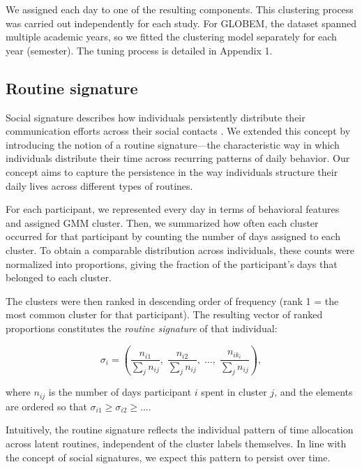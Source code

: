 \documentclass[pdflatex,sn-vancouver,Numbered]{bst/sn-jnl}%
\theoremstyle{thmstyleone}%
\theoremstyle{thmstyletwo}%
\theoremstyle{thmstylethree}%
\begin{document}
We assigned each day to one of the resulting components. This clustering process was carried out independently for each study. For GLOBEM, the dataset spanned multiple academic years, so we fitted the clustering model separately for each year (semester). The tuning process is detailed in Appendix 1.

\subsection*{Routine signature}\label{sec:methods:signature}  

Social signature describes how individuals persistently distribute their communication efforts across their social contacts \cite{saramaki2014persistence}. We extended this concept by introducing the notion of a routine signature—the characteristic way in which individuals distribute their time across recurring patterns of daily behavior. Our concept aims to capture the persistence in the way individuals structure their daily lives across different types of routines.

For each participant, we represented every day in terms of behavioral features and assigned GMM cluster. Then, we summarized how often each cluster occurred for that participant by counting the number of days assigned to each cluster. To obtain a comparable distribution across individuals, these counts were normalized into proportions, giving the fraction of the participant’s days that belonged to each cluster.  

The clusters were then ranked in descending order of frequency (rank 1 = the most common cluster for that participant). 
The resulting vector of ranked proportions constitutes the \textit{routine signature} of that individual:

\begin{equation}
    \sigma_i = \left(
    \frac{n_{i1}}{\sum_j n_{ij}},\;
    \frac{n_{i2}}{\sum_j n_{ij}},\;
    \ldots,\;
    \frac{n_{ik_i}}{\sum_j n_{ij}}
    \right),
\end{equation}

where \(n_{ij}\) is the number of days participant \(i\) spent in cluster \(j\), and the elements are ordered so that \(\sigma_{i1} \geq \sigma_{i2} \geq \dots\).  

Intuitively, the routine signature reflects the individual pattern of time allocation across latent routines, independent of the cluster labels themselves. In line with the concept of social signatures, we expect this pattern to persist over time.
\end{document}
